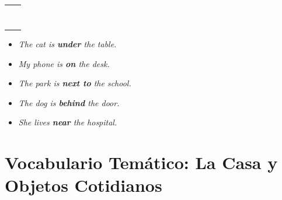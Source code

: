\documentclass[12pt,a4paper]{article}
\begin{document}
\begin{cajachunk}
\begin{multicols}{2}
\begin{tabularx}{\linewidth}{@{} l l @{}}
\eng{in} & \esp{en, dentro de} \\
\eng{on} & \esp{sobre, encima de} \\
\eng{under} & \esp{debajo de} \\
\eng{next to} & \esp{al lado de} \\
\eng{between} & \esp{entre} \\
\eng{behind} & \esp{detrás de} \\
\eng{in front of} & \esp{delante de} \\
\eng{near} & \esp{cerca de} \\
\end{tabularx}

\columnbreak

\begin{cajaejemplo}[Ejemplos]
\begin{itemize}[nosep, leftmargin=0.5cm]
  \item \textit{The cat is \textbf{under} the table.}
  \item \textit{My phone is \textbf{on} the desk.}
  \item \textit{The park is \textbf{next to} the school.}
  \item \textit{The dog is \textbf{behind} the door.}
  \item \textit{She lives \textbf{near} the hospital.}
\end{itemize}
\end{cajaejemplo}
\end{multicols}
\end{cajachunk}

\section{Vocabulario Temático: La Casa y Objetos Cotidianos}
\end{document}
